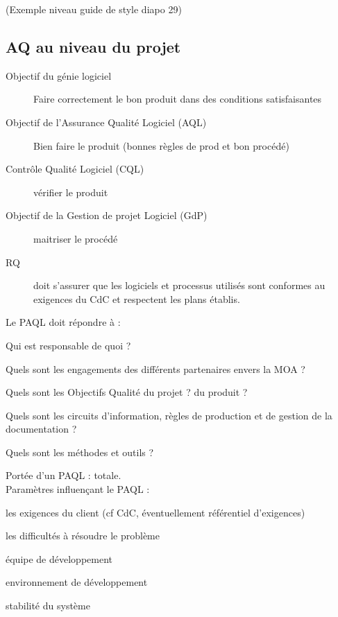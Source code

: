 \begin{description}
(Exemple niveau guide de style diapo 29)

	\subsection{AQ au niveau du projet}

	\begin{description}
		\item[Objectif du génie logiciel] Faire correctement le bon produit dans des conditions satisfaisantes
		\item[Objectif de l’Assurance Qualité Logiciel (AQL)] Bien faire le produit (bonnes règles de prod et bon procédé)
		\item[Contrôle Qualité Logiciel (CQL)] vérifier le produit
		\item[Objectif de la Gestion de projet Logiciel (GdP)] maitriser le procédé
		\item[RQ] doit s’assurer que les logiciels et processus utilisés sont conformes au exigences du CdC et respectent les plans établis.
	\end{description}

	Le PAQL doit répondre à :
	\begin{description}
		\item Qui est responsable de quoi ?
		\item Quels sont les engagements des différents partenaires envers la MOA ?
		\item Quels sont les Objectifs Qualité du projet ? du produit ?
		\item Quels sont les circuits d’information, règles de production et de gestion de la documentation ?
		\item Quels sont les méthodes et outils ?
	\end{description}

Portée d’un PAQL : totale.\\

Paramètres influençant le PAQL :
	\begin{description}
	\item les exigences du client (cf CdC, éventuellement référentiel d'exigences)
	\item les difficultés à résoudre le problème
	\item équipe de développement
	\item environnement de développement
	\item stabilité du système
	\end{description}


\end{description}

